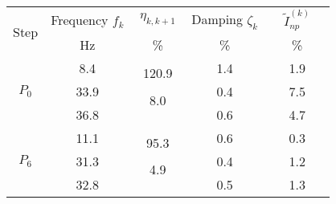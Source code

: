 \documentclass[11p]{article}
\begin{document}
\renewcommand{\arraystretch}{.5}

\begin{tabular}{|c|c|c|c|c|}
\hline
\multicolumn{1}{|c}{\multirow{4}{*}{Step}} & 
\multicolumn{1}{|c|}{\multirow{2}{*}{Frequency $f_k$}} & 
\multicolumn{1}{c|}{\multirow{2}{*}{$\ \eta_{k, k+1}\ $}} & 
\multicolumn{1}{c|}{\multirow{2}{*}{Damping $\zeta_k$}} & 
\multicolumn{1}{c|}{\multirow{2}{*}{$\quad\tilde I_{np}^{(k)}\quad$}} \\
\multicolumn{1}{|c|}{} & \multicolumn{1}{c|}{} & \multicolumn{1}{c|}{} & \multicolumn{1}{c|}{} & \multicolumn{1}{c|}{} \\
 & 
\multicolumn{1}{c|}{\multirow{2}{*}{Hz}} & 
\multicolumn{1}{c|}{\multirow{2}{*}{\%}} & 
\multicolumn{1}{c|}{\multirow{2}{*}{\%}} & 
\multicolumn{1}{c|}{\multirow{2}{*}{\%}} \\
\multicolumn{1}{|c|}{} & \multicolumn{1}{c|}{} & \multicolumn{1}{c|}{} & \multicolumn{1}{c|}{} & \multicolumn{1}{c|}{} \\ \hline \hline
\multirow{6}{*}{$P_0$} & \multirow{2}{*}{8.4} & & \multirow{2}{*}{1.4} & \multirow{2}{*}{1.9} \\ %
 & & \multirow{2}{*}{120.9} & & \\ \cline{2-2} \cline{4-5}
 &   \multirow{2}{*}{33.9} &  & \multirow{2}{*}{0.4} & \multirow{2}{*}{7.5} \\ \cline{3-3}
 & & \multirow{2}{*}{8.0} & & \\ \cline{2-2} \cline{4-5} 
 & \multirow{2}{*}{36.8} & & \multirow{2}{*}{0.6} & \multirow{2}{*}{4.7} \\ %
 & & & & \\ \hline \hline
\multirow{6}{*}{$P_6$} & \multirow{2}{*}{11.1} & & \multirow{2}{*}{0.6} & \multirow{2}{*}{0.3} \\ %
 & & \multirow{2}{*}{95.3} & & \\ \cline{2-2} \cline{4-5} 
 & \multirow{2}{*}{31.3} & & \multirow{2}{*}{0.4} & \multirow{2}{*}{1.2} \\ \cline{3-3}
 & & \multirow{2}{*}{4.9} & & \\ \cline{2-2} \cline{4-5} 
 & \multirow{2}{*}{32.8} & & \multirow{2}{*}{0.5} & \multirow{2}{*}{1.3} \\ \cline{3-3}

\end{tabular}
\end{document}

